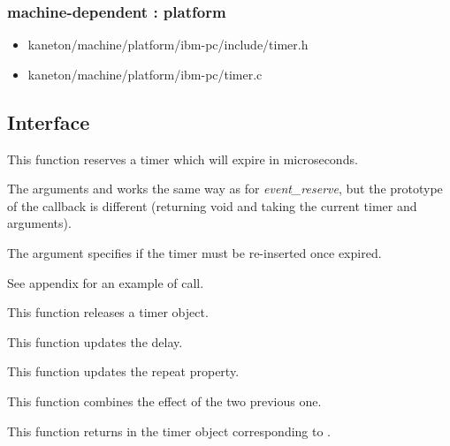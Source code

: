 \subsubsection{\color{filerefcolor} machine-dependent : platform}
\begin{itemize}
\item kaneton/machine/platform/ibm-pc/include/timer.h
\item kaneton/machine/platform/ibm-pc/timer.c
\end{itemize}

\newpage
\subsection*{Interface}

	 {
	   This function reserves a timer which will expire in
	    microseconds.

	   The arguments  and  works
	   the same way as for \emph{event\_reserve}, but the
	   prototype of the callback is different (returning void and
	   taking the current timer  and 
	   arguments).

	   The  argument specifies if the timer
	   must be re-inserted once expired.

	   See appendix for an example of call.
	 }

	 {
	   This function releases a timer object.
	 }

	 {
	   This function updates the delay.
	 }

	 {
	   This function updates the repeat property.
	 }

	 {
	   This function combines the effect of the two previous one.
	 }

	 {
	   This function returns in  the timer object
	   corresponding to .
	 }

